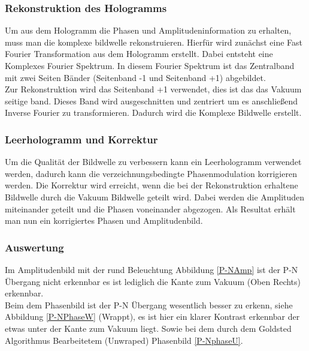 \subsubsection{Rekonstruktion des Hologramms}

Um aus dem Hologramm die Phasen und Amplitudeninformation zu erhalten, muss man die komplexe bildwelle rekonstruieren. Hierfür wird zunächst eine Fast Fourier Transformation aus dem Hologramm erstellt. Dabei entsteht eine Komplexes Fourier Spektrum. In diesem Fourier Spektrum ist das Zentralband mit zwei Seiten Bänder (Seitenband -1 und Seitenband +1) abgebildet.\\
Zur Rekonstruktion wird das Seitenband +1 verwendet, dies ist das das Vakuum seitige band. Dieses Band wird ausgeschnitten und zentriert um es anschließend Inverse Fourier zu transformieren. Dadurch wird die Komplexe Bildwelle erstellt.

\subsubsection{Leerhologramm und Korrektur}

Um die Qualität der Bildwelle zu verbessern kann ein Leerhologramm verwendet werden, dadurch kann die verzeichnungsbedingte Phasenmodulation korrigieren werden. Die Korrektur wird erreicht, wenn die bei der Rekonstruktion erhaltene Bildwelle durch die Vakuum Bildwelle geteilt wird. Dabei werden die Amplituden miteinander geteilt und die Phasen voneinander abgezogen. Als Resultat erhält man nun ein korrigiertes Phasen und Amplitudenbild.

\subsubsection{Auswertung}

Im Amplitudenbild mit der rund Beleuchtung Abbildung \cref{P-NAmp} ist der P-N Übergang nicht erkennbar es ist lediglich die Kante zum Vakuum (Oben Rechts) erkennbar. \\
Beim dem Phasenbild ist der P-N Übergang wesentlich besser zu erkenn, siehe Abbildung \cref{P-NPhaseW} (Wrappt), es ist hier ein klarer Kontrast erkennbar der etwas unter der Kante zum Vakuum liegt. Sowie bei dem durch dem Goldsted Algorithmus Bearbeitetem (Unwraped) Phasenbild \cref{P-NphaseU}. 

